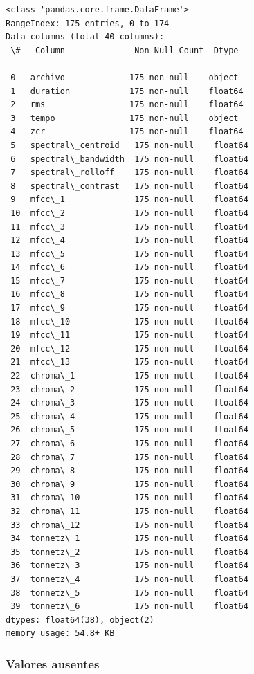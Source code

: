 \documentclass[11pt]{article}
\begin{document}
    \begin{Verbatim}[commandchars=\\\{\}]
<class 'pandas.core.frame.DataFrame'>
RangeIndex: 175 entries, 0 to 174
Data columns (total 40 columns):
 \#   Column              Non-Null Count  Dtype
---  ------              --------------  -----
 0   archivo             175 non-null    object
 1   duration            175 non-null    float64
 2   rms                 175 non-null    float64
 3   tempo               175 non-null    object
 4   zcr                 175 non-null    float64
 5   spectral\_centroid   175 non-null    float64
 6   spectral\_bandwidth  175 non-null    float64
 7   spectral\_rolloff    175 non-null    float64
 8   spectral\_contrast   175 non-null    float64
 9   mfcc\_1              175 non-null    float64
 10  mfcc\_2              175 non-null    float64
 11  mfcc\_3              175 non-null    float64
 12  mfcc\_4              175 non-null    float64
 13  mfcc\_5              175 non-null    float64
 14  mfcc\_6              175 non-null    float64
 15  mfcc\_7              175 non-null    float64
 16  mfcc\_8              175 non-null    float64
 17  mfcc\_9              175 non-null    float64
 18  mfcc\_10             175 non-null    float64
 19  mfcc\_11             175 non-null    float64
 20  mfcc\_12             175 non-null    float64
 21  mfcc\_13             175 non-null    float64
 22  chroma\_1            175 non-null    float64
 23  chroma\_2            175 non-null    float64
 24  chroma\_3            175 non-null    float64
 25  chroma\_4            175 non-null    float64
 26  chroma\_5            175 non-null    float64
 27  chroma\_6            175 non-null    float64
 28  chroma\_7            175 non-null    float64
 29  chroma\_8            175 non-null    float64
 30  chroma\_9            175 non-null    float64
 31  chroma\_10           175 non-null    float64
 32  chroma\_11           175 non-null    float64
 33  chroma\_12           175 non-null    float64
 34  tonnetz\_1           175 non-null    float64
 35  tonnetz\_2           175 non-null    float64
 36  tonnetz\_3           175 non-null    float64
 37  tonnetz\_4           175 non-null    float64
 38  tonnetz\_5           175 non-null    float64
 39  tonnetz\_6           175 non-null    float64
dtypes: float64(38), object(2)
memory usage: 54.8+ KB
    \end{Verbatim}

    \hypertarget{valores-ausentes}{%
\subsubsection{Valores ausentes}\label{valores-ausentes}}
\end{document}

